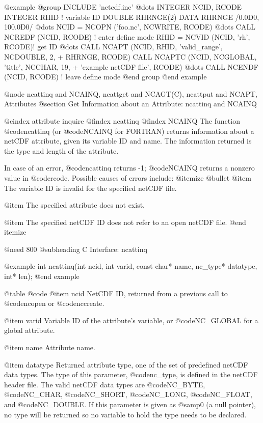 {@example
@group
      INCLUDE 'netcdf.inc'
         @dots{}
      INTEGER  NCID, RCODE
      INTEGER  RHID               ! variable ID
      DOUBLE RHRNGE(2)
      DATA RHRNGE /0.0D0, 100.0D0/
         @dots{}
      NCID = NCOPN ('foo.nc', NCWRITE, RCODE)
         @dots{}
      CALL NCREDF (NCID, RCODE)     ! enter define mode
      RHID = NCVID (NCID, 'rh', RCODE)! get ID
         @dots{}
      CALL NCAPT (NCID, RHID, 'valid_range', NCDOUBLE, 2,
     +            RHRNGE, RCODE)
      CALL NCAPTC (NCID, NCGLOBAL, 'title', NCCHAR, 19,
     +            'example netCDF file', RCODE)
         @dots{}
      CALL NCENDF (NCID, RCODE)     ! leave define mode
@end group
@end example

@node ncattinq and NCAINQ, ncattget and NCAGT(C), ncattput and NCAPT, Attributes
@section Get Information about an Attribute:  ncattinq and NCAINQ

@cindex attribute inquire
@findex ncattinq
@findex NCAINQ
The function @code{ncattinq} (or @code{NCAINQ} for FORTRAN) returns
information about a netCDF attribute, given its variable ID and name.
The information returned is the type and length of the attribute.

In case of an error, @code{ncattinq} returns -1; @code{NCAINQ} returns a
nonzero value in @code{rcode}.  Possible causes of errors include:
@itemize @bullet
@item
The variable ID is invalid for the specified netCDF file.

@item
The specified attribute does not exist.

@item
The specified netCDF ID does not refer to an open netCDF file.
@end itemize

@need 800
@subheading C Interface:  ncattinq

@example
int ncattinq(int ncid, int varid, const char* name,
             nc_type* datatype, int* len);
@end example

@table @code
@item ncid
NetCDF ID, returned from a previous call to @code{ncopen} or @code{nccreate}.

@item varid
Variable ID of the attribute's variable, or @code{NC_GLOBAL} for a
global attribute.

@item name
Attribute name.

@item datatype
Returned attribute type, one of the set of predefined netCDF data types.
The type of this parameter, @code{nc_type}, is defined in the netCDF
header file.  The valid netCDF data types are @code{NC_BYTE},
@code{NC_CHAR}, @code{NC_SHORT}, @code{NC_LONG}, @code{NC_FLOAT}, and
@code{NC_DOUBLE}.  If this parameter is given as @samp{0} (a null pointer),
no type will be returned so no variable to hold the type needs to be
declared.

}
